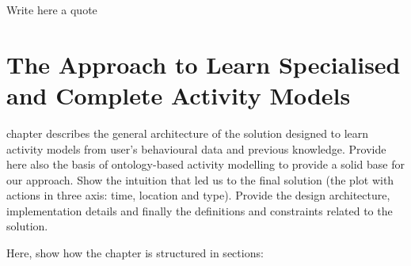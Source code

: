

\begin{savequote}[50mm]
Write here a quote
\end{savequote}


\chapter{The Approach to Learn Specialised and Complete Activity Models}
\label{cha:archi}

\ifpdf
    \graphicspath{{3_approach_to_learning/figures/PDF/}{3_approach_to_learning/figures/PNG/}{3_approach_to_learning/figures/}}
\else
    \graphicspath{{3_approach_to_learning/figures/EPS/}{3_approach_to_learning/figures/}}
\fi

 chapter describes the general architecture of the solution designed to learn activity models from user's behavioural data and previous knowledge. Provide here also the basis of ontology-based activity modelling to provide a solid base for our approach. Show the intuition that led us to the final solution (the plot with actions in three axis: time, location and type). Provide the design architecture, implementation details and finally the definitions and constraints related to the solution.

Here, show how the chapter is structured in sections:

